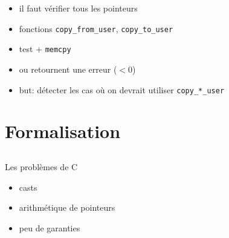 \documentclass{beamer}
\begin{document}
\begin{frame}

\end{frame}


\begin{frame}
\begin{itemize}
    \item il faut vérifier tous les pointeurs
    \item fonctions \texttt{copy\_from\_user}, \texttt{copy\_to\_user}
    \item test + \texttt{memcpy}
    \item ou retournent une erreur ($< 0$)
    \item but: détecter les cas où on devrait utiliser \texttt{copy\_*\_user}
\end{itemize}
\end{frame}



\section{Formalisation} %


\subsection{\langname}

\begin{frame}{Les problèmes de C}
    \begin{itemize}
        \item casts
        \item arithmétique de pointeurs
        \item peu de garanties
    \end{itemize} %
\end{frame}

\end{document}
